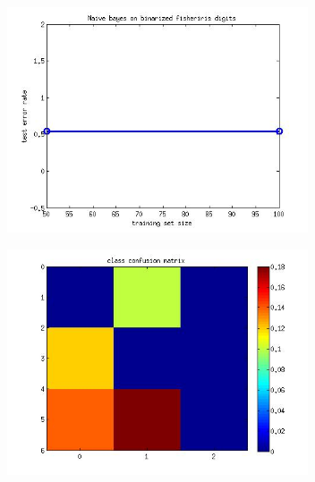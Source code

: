 \documentclass[12pt,letterpaper]{article}
\begin{document}
\centering
\includegraphics [width=3.5in]{HW2_MachineLearning_01.jpg}

\includegraphics [width=3.5in]{HW2_MachineLearning_02.jpg}
\end{document}
